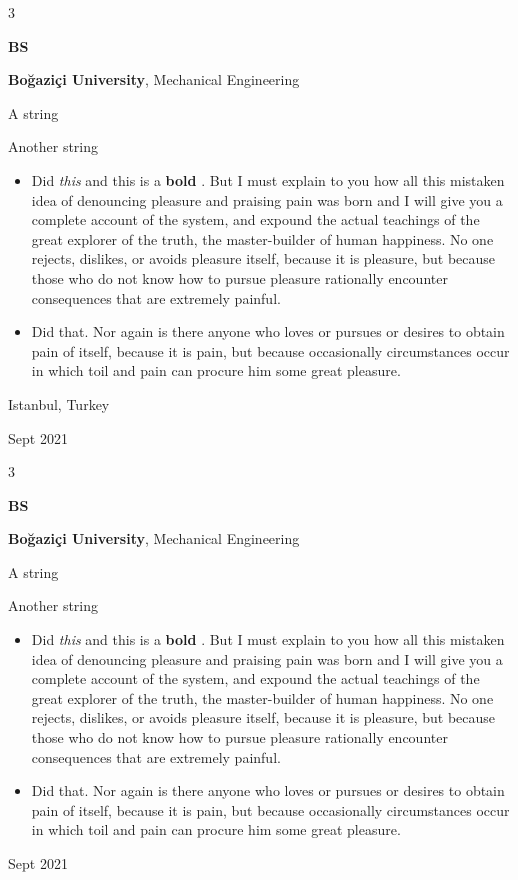 \documentclass[10pt, letterpaper]{article}
\newenvironment{summary}{
    \begin{description}[
        topsep=0.10 cm,
        parsep=0.10 cm,
        partopsep=0pt,
        itemsep=0pt,
        leftmargin=0.4 cm + 10pt
    ]
}{
    \end{description}
} %
\newenvironment{highlights}{
    \begin{itemize}[
        topsep=0.10 cm,
        parsep=0.10 cm,
        partopsep=0pt,
        itemsep=0pt,
        leftmargin=0.4 cm + 10pt
    ]
}{
    \end{itemize}
} %
\newenvironment{threecolentry}[3][]{
    \onecolentry
    \def\thirdColumn{#3}
    \setcolumnwidth{1 cm, \fill, 4.5 cm}
    \begin{paracol}{3}
    {\raggedright #2} \switchcolumn
}{
    \switchcolumn \raggedleft \thirdColumn
    \end{paracol}
    \endonecolentry
} %
\let\hrefWithoutArrow\href
\renewcommand{\href}[2]{\hrefWithoutArrow{#1}{\ifthenelse{\equal{#2}{}}{ }{#2 }\raisebox{.15ex}{\footnotesize \faExternalLink*}}}
\begin{document}
        \begin{threecolentry}{\textbf{BS}}{
            Istanbul, Turkey

        Sept 2021
        }
            \textbf{Boğaziçi University}, Mechanical Engineering
            \begin{summary}
                \item A string
                \item Another string
            \end{summary}
            \begin{highlights}
                \item Did \textit{this} and this is a \textbf{bold} \href{https://example.com}{link}. But I must explain to you how all this mistaken idea of denouncing pleasure and praising pain was born and I will give you a complete account of the system, and expound the actual teachings of the great explorer of the truth, the master-builder of human happiness. No one rejects, dislikes, or avoids pleasure itself, because it is pleasure, but because those who do not know how to pursue pleasure rationally encounter consequences that are extremely painful.
                \item Did that. Nor again is there anyone who loves or pursues or desires to obtain pain of itself, because it is pain, but because occasionally circumstances occur in which toil and pain can procure him some great pleasure.
            \end{highlights}
        \end{threecolentry}

        \vspace{0.2 cm}

        \begin{threecolentry}{\textbf{BS}}{
            Sept 2021
        }
            \textbf{Boğaziçi University}, Mechanical Engineering
            \begin{summary}
                \item A string
                \item Another string
            \end{summary}
            \begin{highlights}
                \item Did \textit{this} and this is a \textbf{bold} \href{https://example.com}{link}. But I must explain to you how all this mistaken idea of denouncing pleasure and praising pain was born and I will give you a complete account of the system, and expound the actual teachings of the great explorer of the truth, the master-builder of human happiness. No one rejects, dislikes, or avoids pleasure itself, because it is pleasure, but because those who do not know how to pursue pleasure rationally encounter consequences that are extremely painful.
                \item Did that. Nor again is there anyone who loves or pursues or desires to obtain pain of itself, because it is pain, but because occasionally circumstances occur in which toil and pain can procure him some great pleasure.
            \end{highlights}
        \end{threecolentry}
\end{document}
